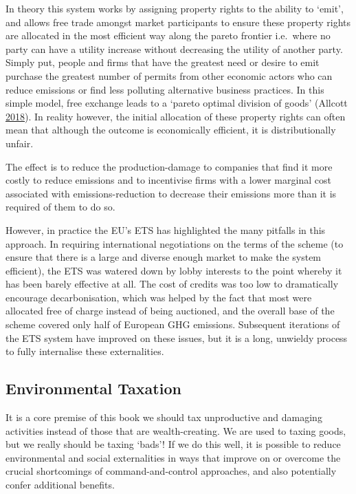 \documentclass[]{tufte-handout}
\begin{document}
In theory this system works by assigning property rights to the ability
to `emit', and allows free trade amongst market participants to ensure
these property rights are allocated in the most efficient way along the
pareto frontier i.e.~where no party can have a utility increase without
decreasing the utility of another party. Simply put, people and firms
that have the greatest need or desire to emit purchase the greatest
number of permits from other economic actors who can reduce emissions or
find less polluting alternative business practices. In this simple
model, free exchange leads to a `pareto optimal division of goods'
(Allcott \protect\hyperlink{ref-Allcott2018}{2018}). In reality however,
the initial allocation of these property rights can often mean that
although the outcome is economically efficient, it is distributionally
unfair.

The effect is to reduce the production-damage to companies that find it
more costly to reduce emissions and to incentivise firms with a lower
marginal cost associated with emissions-reduction to decrease their
emissions more than it is required of them to do so.

However, in practice the EU's ETS has highlighted the many pitfalls in
this approach. In requiring international negotiations on the terms of
the scheme (to ensure that there is a large and diverse enough market to
make the system efficient), the ETS was watered down by lobby interests
to the point whereby it has been barely effective at all. The cost of
credits was too low to dramatically encourage decarbonisation, which was
helped by the fact that most were allocated free of charge instead of
being auctioned, and the overall base of the scheme covered only half of
European GHG emissions. Subsequent iterations of the ETS system have
improved on these issues, but it is a long, unwieldy process to fully
internalise these externalities.

\hypertarget{environmental-taxation}{%
\subsection{Environmental Taxation}\label{environmental-taxation}}

It is a core premise of this book we should tax unproductive and
damaging activities instead of those that are wealth-creating. We are
used to taxing goods, but we really should be taxing `bads'! If we do
this well, it is possible to reduce environmental and social
externalities in ways that improve on or overcome the crucial
shortcomings of command-and-control approaches, and also potentially
confer additional benefits.
\end{document}
